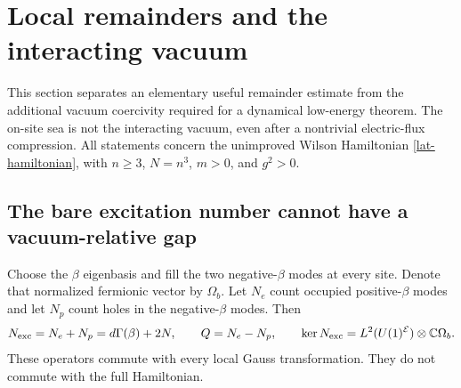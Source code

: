 \section{Local remainders and the interacting vacuum}
\label{rel4-section}

This section separates an elementary useful remainder estimate from
the additional vacuum coercivity required for a dynamical low-energy
theorem. The on-site sea is not the interacting vacuum, even after a
nontrivial electric-flux compression. All statements concern the
unimproved Wilson Hamiltonian \eqref{lat-hamiltonian}, with $n\ge3$,
$N=n^3$, $m>0$, and $g^2>0$.

\subsection{The bare excitation number cannot have a vacuum-relative gap}

Choose the $\beta$ eigenbasis and fill the two negative-$\beta$ modes
at every site. Denote that normalized fermionic vector by $\Omega_b$.
Let $N_e$ count occupied positive-$\beta$ modes and let $N_p$ count
holes in the negative-$\beta$ modes. Then
\begin{equation}
 N_{\rm exc}=N_e+N_p=d\Gamma(\beta)+2N,\qquad
 Q=N_e-N_p,\qquad
 \ker N_{\rm exc}=L^2(U(1)^{\mathcal E})\otimes\mathbb C\Omega_b .
 \label{rel4-excitation-definition}
\end{equation}
These operators commute with every local Gauss transformation.
They do not commute with the full Hamiltonian.

